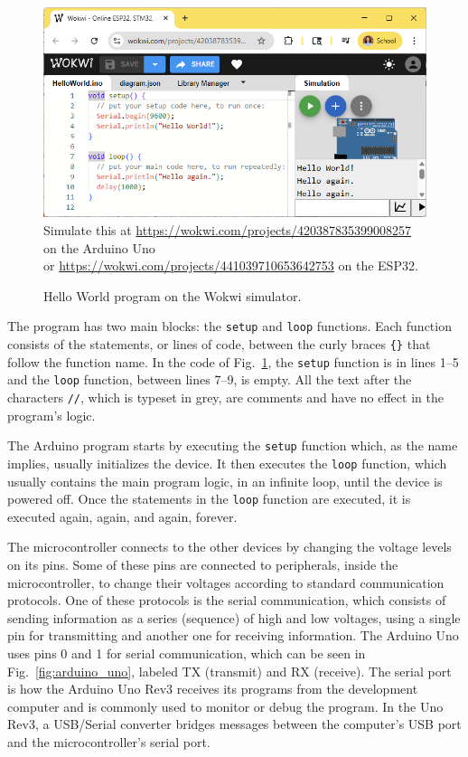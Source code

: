
\begin{figure}[t]
  \begin{wide}
    \includegraphics[width=\textwidth]{img/wokwi-hello.png}
    \\ \scriptsize
    Simulate this at \url{https://wokwi.com/projects/420387835399008257} on the Arduino Uno \\
    or \url{https://wokwi.com/projects/441039710653642753} on the ESP32.
    \caption{Hello World program on the Wokwi simulator.}
    \label{fig:wokwi-hello}
  \end{wide}
\end{figure}

The program has two main blocks: the \texttt{setup} and \texttt{loop} functions.
Each function consists of the statements, or lines of code, between the curly braces \texttt{\{\}} that follow the function name.
In the code of Fig.~\ref{fig:wokwi-hello}, the \texttt{setup} function is in lines 1--5 and the \texttt{loop} function, between lines 7--9, is empty.
All the text after the characters \texttt{//}, which is typeset in grey, are comments and have no effect in the program's logic.

The Arduino program starts by executing the \texttt{setup} function which, as the name implies, usually initializes the device.
It then executes the \texttt{loop} function, which usually contains the main program logic, in an infinite loop, until the device is powered off.
Once the statements in the \texttt{loop} function are executed, it is executed again, again, and again, forever.

The microcontroller connects to the other devices by changing the voltage levels on its pins.
Some of these pins are connected to peripherals, inside the microcontroller, to change their voltages according to standard communication protocols.
One of these protocols is the serial communication, which consists of sending information as a series (sequence) of high and low voltages, using a single pin for transmitting and another one for receiving information.
The Arduino Uno uses pins 0 and 1 for serial communication, which can be seen in Fig.~\ref{fig:arduino_uno}, labeled TX (transmit) and RX (receive).
The serial port is how the Arduino Uno Rev3 receives its programs from the development computer and is commonly used to monitor or debug the program.
In the Uno Rev3, a USB/Serial converter bridges messages between the computer's USB port and the microcontroller's serial port.

